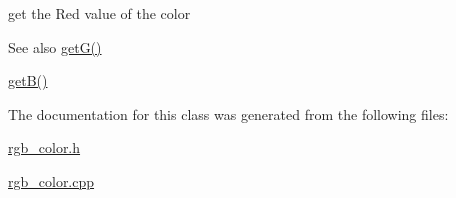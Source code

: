 get the Red value of the color 

\begin{DoxySeeAlso}{See also}
\mbox{\hyperlink{class_r_g_b_color_a1d8c10aec49393fa8ed68b137352ef19}{get\+G()}} 

\mbox{\hyperlink{class_r_g_b_color_a55500b063148c853e65eb5b420eb4887}{get\+B()}} 
\end{DoxySeeAlso}


The documentation for this class was generated from the following files\+:\begin{DoxyCompactItemize}
\item 
\mbox{\hyperlink{rgb__color_8h}{rgb\+\_\+color.\+h}}\item 
\mbox{\hyperlink{rgb__color_8cpp}{rgb\+\_\+color.\+cpp}}\end{DoxyCompactItemize}
